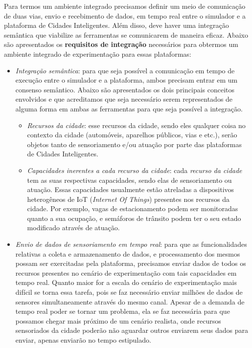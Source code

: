 Para termos um ambiente integrado precisamos definir um meio de comunicação de duas vias, envio e recebimento de dados, em tempo real entre o simulador e a plataforma de Cidades Inteligentes.
Além disso, deve haver uma integração semântica que viabilize as ferramentas se comunicarem de maneira eficaz.
Abaixo são apresentados os \textbf{requisitos de integração} necessários para obtermos um ambiente integrado de experimentação para essas plataformas:

\begin{itemize}
    \item \textit{Integração semântica}: para que seja possível a comunicação em tempo de execução entre o simulador e a plataforma, ambos precisam entrar em um consenso semântico.
        Abaixo são apresentados os dois principais conceitos envolvidos e que acreditamos que seja necessário serem representados de alguma forma em ambas as ferramentas para que seja
        possível a integração.

        \begin{itemize}
            \item \textit{Recursos da cidade}: esse recursos da cidade, sendo eles qualquer coisa no contexto da cidade (automóveis, aparelhos públicos, vias e etc.), serão objetos tanto de
                sensoriamento e/ou atuação por parte das plataformas de Cidades Inteligentes.

            \item \textit{Capacidades inerentes a cada recurso da cidade}: cada \textit{recurso da cidade} tem as suas respectivas capacidades, sendo elas de sensoriamento ou atuação.
                Essas capacidades usualmente estão atreladas a dispositivos heterogêneos de IoT (\textit{Internet Of Things}) presentes nos recursos da cidade.
                Por exemplo, vagas de estacionamento podem ser monitoradas quanto a sua ocupação, e semáforos de trânsito podem ter o seu estado modificado através de atuação.
        \end{itemize}

    \item \textit{Envio de dados de sensoriamento em tempo real}: para que as funcionalidades relativas a coleta e armazenamento de dados, e processamento dos mesmos possam ser
        exercitadas pela plataforma, precisamos enviar dados de todos os recursos presentes no cenário de experimentação com tais capacidades em tempo real.
        Quanto maior for a escala do cenário de experimentação mais difícil se torna essa tarefa, pois se faz necessário enviar milhões de dados de sensores simultaneamente através
        do mesmo canal.
        Apesar de a demanda de tempo real poder se tornar um problema, ela se faz necessária para que possamos chegar mais próximo de um cenário realista, onde recursos sensoriados
        da cidade poderão não aguardar outros enviarem seus dados para enviar, apenas enviarão no tempo estipulado.


\end{itemize}
